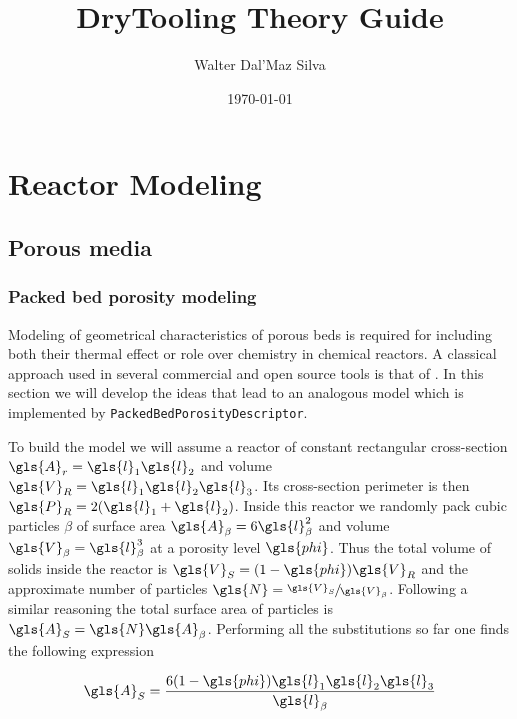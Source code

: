 \documentclass[oneside]{textbook}
\title{DryTooling Theory Guide}
\author{Walter Dal'Maz Silva}
\date{\today}
\begin{document}
\maketitle%

\tableofcontents%


\part{Reactor Modeling}

\chapter{\label{ch:porous-media}Porous media}%

\section{Packed bed porosity modeling}

Modeling of geometrical characteristics of porous beds is required for including both their thermal effect or role over chemistry in chemical reactors. A classical approach used in several commercial and open source tools is that of \textcite{Gunn1978}. In this section we will develop the ideas that lead to an analogous model which is implemented by \lstinline{PackedBedPorosityDescriptor}.

To build the model we will assume a reactor of constant rectangular cross-section $\gls{A}_{r}=\gls{l}_1\gls{l}_2$ and volume  $\gls{V}_{R}=\gls{l}_1\gls{l}_2\gls{l}_3$. Its cross-section perimeter is then $\gls{P}_{R}=2(\gls{l}_1+\gls{l}_2)$. Inside this reactor we randomly pack cubic particles $\beta$ of surface area $\gls{A}_{\beta}=6\gls{l}_{\beta}^2$ and volume $\gls{V}_{\beta}=\gls{l}_{\beta}^3$ at a porosity level $\gls{phi}$. Thus the total volume of solids inside the reactor is $\gls{V}_{S}=(1-\gls{phi})\gls{V}_{R}$ and the approximate number of particles $\gls{N}=\sfrac{\gls{V}_{S}}{\gls{V}_{\beta}}$. Following a similar reasoning the total surface area of particles is $\gls{A}_{S}=\gls{N}\gls{A}_{\beta}$. Performing all the substitutions so far one finds the following expression

\begin{equation}
\gls{A}_{S}=\frac{6(1-\gls{phi})\gls{l}_1\gls{l}_2\gls{l}_3}{\gls{l}_{\beta}}
\end{equation}
\end{document}
